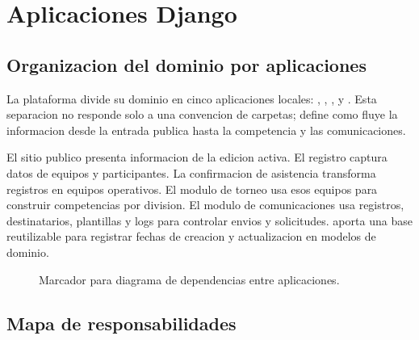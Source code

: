 \chapter{Aplicaciones Django}
\label{chap:aplicaciones-django}

\section{Organizacion del dominio por aplicaciones}
\label{sec:apps-organizacion}

La plataforma divide su dominio en cinco aplicaciones locales: , , ,  y . Esta separacion no responde solo a una convencion de carpetas; define como fluye la informacion desde la entrada publica hasta la competencia y las comunicaciones.

El sitio publico presenta informacion de la edicion activa. El registro captura datos de equipos y participantes. La confirmacion de asistencia transforma registros en equipos operativos. El modulo de torneo usa esos equipos para construir competencias por division. El modulo de comunicaciones usa registros, destinatarios, plantillas y logs para controlar envios y solicitudes.  aporta una base reutilizable para registrar fechas de creacion y actualizacion en modelos de dominio.

\begin{figure}[H]
  \centering
  \caption{Marcador para diagrama de dependencias entre aplicaciones.}
  \label{fig:apps-dependencias}
\end{figure}

\section{Mapa de responsabilidades}
\label{sec:apps-mapa-responsabilidades}

